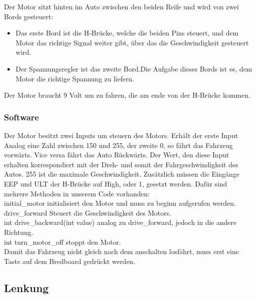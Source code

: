 		Der Motor sitzt hinten im Auto zwischen den beiden  Reife und wird von zwei Bords gesteuert:
		
		\begin{itemize}
			\item Das erste Bord ist die H-Brücke, welche die beiden Pins steuert, und dem Motor das richtige Signal weiter gibt, über das die Geschwindigkeit gesteuert wird. 
			\item Der Spannungsregler ist das zweite Bord.Die Aufgabe dieses Bords ist es, dem Motor die richtige Spannung zu liefern.
		\end{itemize} 
	
		
		
		Der Motor braucht 9 Volt um zu fahren, die am ende von der H-Brücke kommen.
		
	\subsubsection{Software}
	
		Der Motor besitzt zwei Inputs um steuern des Motors. Erhält der erste Input Analog eine Zahl zwischen 150 und 255, der zweite 0, so fährt das Fahrzeug vorwärts. Vice versa fährt das Auto Rückwärts. Der Wert, den diese Input erhalten korrespondiert mit der Dreh- und somit der Fahrgeschwindigkeit des Autos. 255 ist die maximale Geschwindigkeit. Zusätzlich müssen die Eingänge EEP und ULT der H-Brücke auf High, oder 1, gesetzt werden. Dafür sind mehrere Methoden in unserem Code vorhanden: \\
		
		initial\_motor initialisiert den Motor und muss zu beginn aufgerufen werden.\\
		
		drive\_forward Steuert die Geschwindigkeit des Motors. \\
		
		int drive\_backward(int value) analog zu drive\_forward, jedoch in die andere Richtung.\\
		
		int turn\_motor\_off stoppt den Motor.\\
		
		Damit das Fahrzeug nicht gleich nach dem anschalten losfährt, muss erst eine Taste auf dem Bredboard gedrückt werden. 
		
	\subsection{Lenkung}
	\label{Lenkung}
	
